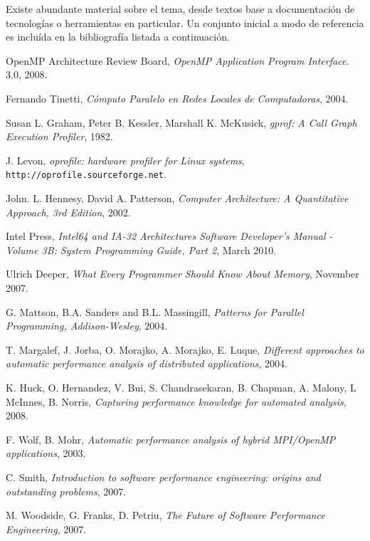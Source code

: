 \documentclass[a4paper]{article}
\begin{document}
Existe abundante material sobre el tema, desde textos base a documentaci\'on
de tecnolog\'ias o herramientas en particular. Un conjunto inicial a modo de
referencia es inclu\'ida en la bibliograf\'ia listada a continuaci\'on.

\begin{thebibliography}{9}
  
  OpenMP Architecture Review Board,
  \emph{OpenMP Application Program Interface}.
  3.0,
  2008.

  Fernando Tinetti,
  \emph{C\'omputo Paralelo en Redes Locales de Computadoras},
  2004.

 Susan L. Graham,  Peter B. Kessler,  Marshall K. McKusick,
 \emph{gprof: A Call Graph Execution Profiler},
 1982.

J. Levon,
\emph{oprofile: hardware profiler for Linux systems},
{\tt http://oprofile.sourceforge.net}.

 John. L. Hennesy, David A. Patterson,
 \emph{Computer Architecture: A Quantitative Approach, 3rd Edition},
 2002.

 Intel Press,
 \emph{Intel64 and IA-32 Architectures Software Developer's Manual - Volume 3B: System Programming Guide, Part 2},
 March 2010.

 Ulrich Deeper,
 \emph{What Every Programmer Should Know About Memory},
 November 2007.

 G. Mattson, B.A. Sanders and B.L. Massingill, 
 \emph{Patterns for Parallel Programming, Addison-Wesley},
 2004.

 T. Margalef, J. Jorba, O. Morajko, A. Morajko, E. Luque,
 \emph{Different approaches to automatic performance analysis of distributed applications},
 2004.

 K. Huck, O. Hernandez, V. Bui, S. Chandrasekaran, B. Chapman, A. Malony, L McInnes, B. Norris,
 \emph{Capturing performance knowledge for automated analysis},
 2008.

 F. Wolf, B. Mohr,
 \emph{Automatic performance analysis of hybrid MPI/OpenMP applications},
 2003.

 C. Smith,
 \emph{Introduction to software performance engineering: origins and outstanding problems},
 2007.

 M. Woodside, G. Franks, D. Petriu,
 \emph{The Future of Software Performance Engineering},
 2007.


\end{thebibliography}
\end{document}
